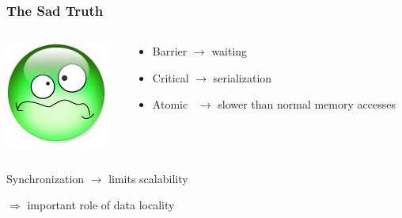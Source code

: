 \documentclass[xcolor={x11names,svgnames},x11names,svgnames]{beamer}
\begin{document}

\begin{frame}
  \frametitle{The Sad Truth}

    \begin{columns}[c]
    \begin{column}{.1\textwidth}
      \includegraphics[width=\textwidth]{triste.png}
    \end{column}
    \begin{column}{.9\textwidth}

      
  \begin{itemize}
  \item Barrier $\rightarrow$ waiting
  \item Critical $\rightarrow$ serialization
  \item Atomic~  $\rightarrow$ slower than normal memory accesses
  \end{itemize}

\end{column}
\end{columns}

\bigskip
  
  Synchronization $\rightarrow$ limits scalability

  \bigskip

  $\Longrightarrow$ important role of data locality
\end{frame}
\end{document}
